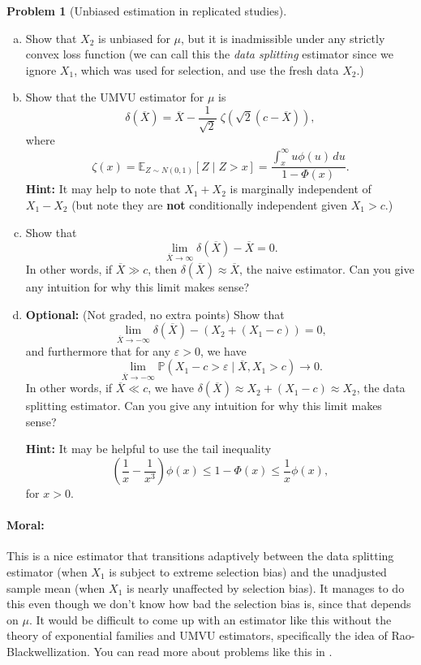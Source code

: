 \documentclass{article}
\newcommand{\EE}{\mathbb{E}}
\newcommand{\PP}{\mathbb{P}}
\newcommand{\ep}{\varepsilon}
\newcommand{\optional}{{\bf Optional:} (Not graded, no extra points) }
\theoremstyle{definition}
\newtheorem{problem}{Problem}
\begin{document}
\begin{problem}[Unbiased estimation in replicated studies]
\begin{enumerate}[(a)]
\item Show that $X_2$ is unbiased for $\mu$, but it is inadmissible under any strictly convex loss function (we can call this the {\em data splitting} estimator since we ignore $X_1$, which was used for selection, and use the fresh data $X_2$.)



\item Show that the UMVU estimator for $\mu$ is
\[
\delta(\overline{X}) = \overline{X} - 
\frac{1}{\sqrt{2}}\;\zeta\left(\sqrt{2}(c-\overline{X})\right),
\]
where 
\[
\zeta(x) = \EE_{Z \sim N(0,1)}[Z \mid Z > x] = \frac{\int_x^\infty u\phi(u)\,d  u}{1-\Phi(x)}.
\]
{\bf Hint:} It may help to note that $X_1+X_2$ is marginally independent of $X_1 - X_2$ (but note they are {\bf not} conditionally independent given $X_1 > c$.)





\item Show that 
  \[
  \lim_{\overline{X} \to \infty} \delta(\overline{X}) - \overline{X} = 0.
  \]
  In other words, if $\overline{X} \gg c$, then $\delta(\overline{X}) \approx \overline{X}$, the naive estimator.
  Can you give any intuition for why this limit makes sense?





\item \optional Show that
  \[
  \lim_{\overline{X} \to -\infty} \delta(\overline{X}) - \left(X_2 + (X_1-c)\right) = 0,
  \]
  and furthermore that for any $\ep > 0$, we have
  \[
  \lim_{\overline{X} \to -\infty} \PP(X_1 - c > \ep \mid \overline{X}, X_1 > c) \to 0.
  \]
  In other words, if $\overline{X} \ll c$, we have $\delta(\overline{X}) \approx X_2 + (X_1-c) \approx X_2$, the data splitting estimator. Can you give any intuition for why this limit makes sense?

{\bf Hint:} It may be helpful to use the tail inequality
\[
\left(\frac{1}{x} - \frac{1}{x^3}\right)\phi(x) \leq 1-\Phi(x) \leq \frac{1}{x} \phi(x),
\]
for $x>0$.



\end{enumerate}


\paragraph{Moral:} This is a nice estimator that transitions adaptively between the data splitting estimator (when $X_1$ is subject to extreme selection bias) and the unadjusted sample mean (when $X_1$ is nearly unaffected by selection bias). It manages to do this even though we don't know how bad the selection bias is, since that depends on $\mu$. It would be difficult to come up with an estimator like this without the theory of exponential families and UMVU estimators, specifically the idea of Rao-Blackwellization. You can read more about problems like this in \citet{hung2020statistical}.

\end{problem}
\end{document}
